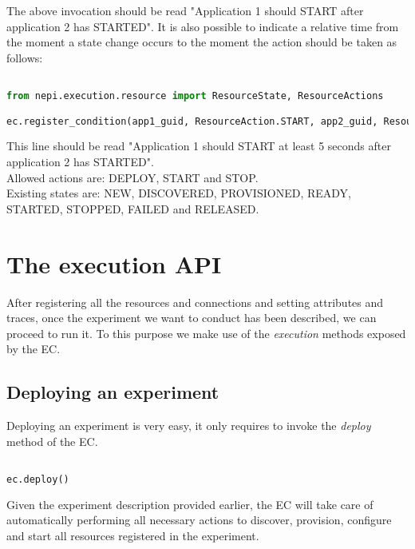 The above invocation should be read "Application 1 should START after application 2 
has STARTED". It is also possible to indicate a relative time from the moment a state
change occurs to the moment the action should be taken as follows:

\begin{lstlisting}[language=Python]

from nepi.execution.resource import ResourceState, ResourceActions

ec.register_condition(app1_guid, ResourceAction.START, app2_guid, ResourceState.STARTED, time = "5s")

\end{lstlisting}

This line should be read "Application 1 should START at least 5 seconds after 
application 2 has STARTED". \\

Allowed actions are: DEPLOY, START and STOP. \\

Existing states are: NEW, DISCOVERED, PROVISIONED, READY, STARTED, STOPPED, 
FAILED and RELEASED. \\



\section{The execution API}

After registering all the resources and connections and setting attributes and
traces, once the experiment we want to conduct has been described, we can
proceed to run it. To this purpose we make use of the \emph{execution} methods
exposed by the EC.


\subsection{Deploying an experiment}

Deploying an experiment is very easy, it only requires to invoke the 
\emph{deploy} method of the EC.

\begin{lstlisting}[language=Python]

ec.deploy()

\end{lstlisting}

Given the experiment description provided earlier, the EC will take care
of automatically performing all necessary actions to discover, provision,
configure and start all resources registered in the experiment. 

